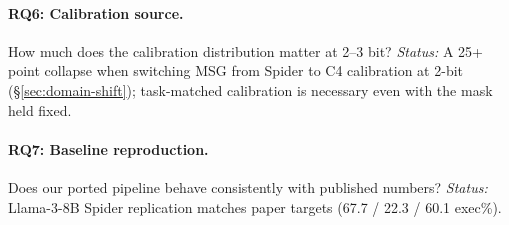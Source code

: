 \paragraph{RQ6: Calibration source.}
How much does the calibration distribution matter at 2--3 bit?
\emph{Status:} A 25+ point collapse when switching \baseline{} MSG from Spider
to C4 calibration at 2-bit (\S\ref{sec:domain-shift}); task-matched
calibration is necessary even with the mask held fixed.

\paragraph{RQ7: Baseline reproduction.}
Does our ported \baseline{} pipeline behave consistently with published
numbers? \emph{Status:} Llama-3-8B Spider replication matches paper targets
(67.7 / 22.3 / 60.1 exec\%).

